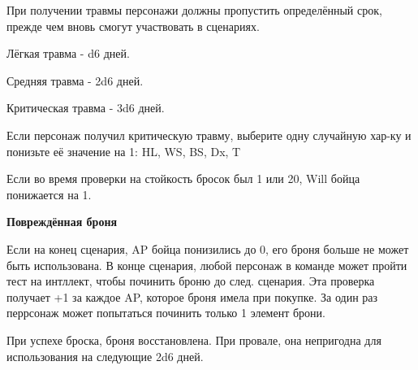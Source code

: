 \begin{multicols}{2}
    При получении травмы персонажи должны пропустить определённый срок, прежде чем вновь смогут участвовать в сценариях.

    Лёгкая травма - d6 дней.

    Средняя травма - 2d6 дней.

    Критическая травма - 3d6 дней.

    Если персонаж получил критическую травму, выберите одну случайную хар-ку и понизьте её значение на 1: HL, WS, BS, Dx, T

    Если во время проверки на стойкость бросок был 1 или 20, Will бойца понижается на 1.

    \textbf{Повреждённая броня}

    Если на конец сценария, AP бойца понизились до 0, его броня больше не может быть использована. В конце сценария, любой персонаж в команде может 
    пройти тест на интллект, чтобы починить броню до след. сценария. Эта проверка получает +1 за каждое AP, которое броня имела при покупке. За один раз перрсонаж может попытаться 
    починить только 1 элемент брони.

    При успехе броска, броня восстановлена. При провале, она непригодна для использования на следующие 2d6 дней.

\end{multicols}